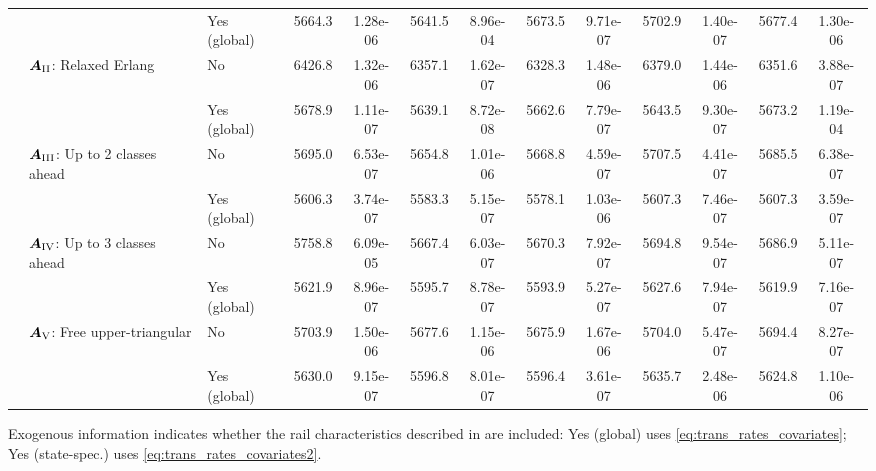 \begin{threeparttable}
\begin{tabular}[t]{>{}lllcccccccccc}
\hspace{1em} &  & Yes (global) & 5664.3 & 1.28e-06 & 5641.5 & 8.96e-04 & 5673.5 & 9.71e-07 & 5702.9 & 1.40e-07 & 5677.4 & 1.30e-06\\

\addlinespace[0.5em]

\hspace{1em} & $\bm{A}_{\RN{2}}$: Relaxed Erlang & No & 6426.8 & 1.32e-06 & 6357.1 & 1.62e-07 & 6328.3 & 1.48e-06 & 6379.0 & 1.44e-06 & 6351.6 & 3.88e-07\\

\hspace{1em} &  & Yes (global) & 5678.9 & 1.11e-07 & 5639.1 & 8.72e-08 & 5662.6 & 7.79e-07 & 5643.5 & 9.30e-07 & 5673.2 & 1.19e-04\\

\addlinespace[0.5em]

\hspace{1em} & $\bm{A}_{\RN{3}}$: Up to 2 classes ahead & No & 5695.0 & 6.53e-07 & 5654.8 & 1.01e-06 & 5668.8 & 4.59e-07 & 5707.5 & 4.41e-07 & 5685.5 & 6.38e-07\\

\hspace{1em} &  & Yes (global) & 5606.3 & 3.74e-07 & 5583.3 & 5.15e-07 & 5578.1 & 1.03e-06 & 5607.3 & 7.46e-07 & 5607.3 & 3.59e-07\\

\addlinespace[0.5em]

\hspace{1em} & $\bm{A}_{\RN{4}}$: Up to 3 classes ahead & No & 5758.8 & 6.09e-05 & 5667.4 & 6.03e-07 & 5670.3 & 7.92e-07 & 5694.8 & 9.54e-07 & 5686.9 & 5.11e-07\\

\hspace{1em} &  & Yes (global) & 5621.9 & 8.96e-07 & 5595.7 & 8.78e-07 & 5593.9 & 5.27e-07 & 5627.6 & 7.94e-07 & 5619.9 & 7.16e-07\\

\addlinespace[0.5em]

\hspace{1em} & $\bm{A}_{\RN{5}}$: Free upper-triangular & No & 5703.9 & 1.50e-06 & 5677.6 & 1.15e-06 & 5675.9 & 1.67e-06 & 5704.0 & 5.47e-07 & 5694.4 & 8.27e-07\\

\hspace{1em} &  & Yes (global) & 5630.0 & 9.15e-07 & 5596.8 & 8.01e-07 & 5596.4 & 3.61e-07 & 5635.7 & 2.48e-06 & 5624.8 & 1.10e-06\\
\bottomrule
\end{tabular}
\begin{tablenotes}
\item[1] Exogenous information indicates whether the rail characteristics described in  are included: Yes (global) uses \cref{eq:trans_rates_covariates}; Yes (state-spec.) uses \cref{eq:trans_rates_covariates2}.
\end{tablenotes}
\end{threeparttable}

